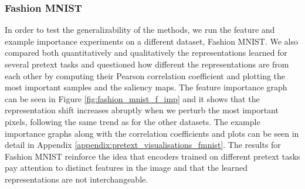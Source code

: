 
\subsubsection{Fashion MNIST}

In order to test the generalizability of the methods, we run the feature and example importance experiments on a different dataset, Fashion MNIST. We also compared both quantitatively and qualitatively the representations learned for several pretext tasks and questioned how different the representations are from each other by computing their Pearson correlation coefficient and plotting the most important samples and the saliency maps. The feature importance graph can be seen in Figure \ref{fig:fashion_mnist_f_imp} and it shows that the representation shift increases abruptly when we perturb the most important pixels, following the same trend as for the other datasets. The example importance graphs along with the correlation coefficients and plots can be seen in detail in Appendix \ref{appendix:pretext_visualisations_fmnist}. The results for Fashion MNIST reinforce the idea that encoders trained on different pretext tasks pay attention to distinct features in the image and that the learned representations are not interchangeable.

